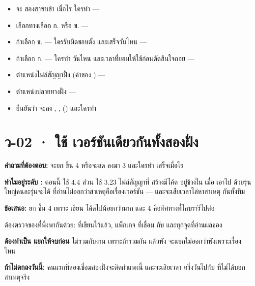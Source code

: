 \begin{outbox}
\begin{itemize}
\item จะ  สองสาขาเข้า  เมื่อไร ใครทำ ---
\item เลือกทางเลือก ก. หรือ ข. ---
\item ถ้าเลือก ข. --- ใครรับผิดชอบตั้ง  และเสร็จวันไหน ---
\item ถ้าเลือก ก. --- ใครทำ วันไหน และเวลาที่ยอมให้ใช้ก่อนตัดสินใจถอย ---
\item ตำแหน่งไฟล์สัญญาฝั่ง  (ค่าของ ) ---
\item ตำแหน่งปลายทางฝั่ง  ---
\item ยืนยันว่า  จะลง , ,
       () และใครทำ
\end{itemize}
\end{outbox}

\section{ว-02 · ใช้  เวอร์ชันเดียวกันทั้งสองฝั่ง}

\textbf{คำถามที่ต้องตอบ:} จะยก  ขึ้น  4 หรือจะลด
 ลงมา 3 และใครทำ เสร็จเมื่อไร

\textbf{ทำไมอยู่ระดับ \pzero{}:} ตอนนี้  ใช้  4.4 ส่วน
 ใช้ 3.23 ไฟล์สัญญาที่  สร้างมีโค้ด 
อยู่ข้างใน เมื่อ  เอาไป  ด้วยรุ่นใหญ่คนละรุ่นจะได้
 ที่อ่านไม่ออกว่าสาเหตุคือเรื่องเวอร์ชัน --- และจะเสียเวลาไล่หาสาเหตุ
กันทั้งทีม

\textbf{ข้อเสนอ:} ยก  ขึ้น  4 เพราะ  เขียน
โค้ดไปน้อยกว่ามาก และ  4 คือทิศทางที่ไลบรารีไปต่อ

\begin{warnbox}[title={งานนี้ไม่ใช่แค่เปลี่ยนตัวเลขใน \code{package.json}}]
ต้องตรวจของที่พึ่งพากันด้วย: 
ที่เขียนไว้แล้ว, แพ็กเกจ  ที่เชื่อม
 กับ  และทุกจุดที่อ่านผลของ 

\textbf{ต้องทำเป็น  แยกให้จบก่อน} ไม่รวมกับงาน  เพราะถ้ารวมกัน
แล้วพัง จะแยกไม่ออกว่าพังเพราะเรื่องไหน
\end{warnbox}

\textbf{ถ้าไม่ตกลงวันนี้:} คนแรกที่ลองเชื่อมสองฝั่งจะติดกำแพงนี้ และจะเสียเวลา
ครึ่งวันไปกับ  ที่ไม่ได้บอกสาเหตุจริง

